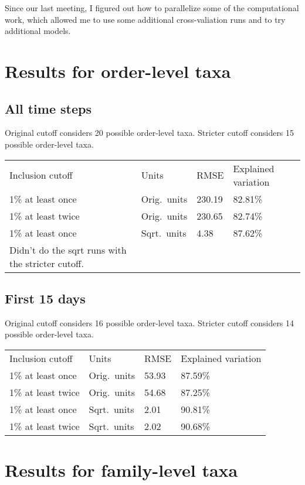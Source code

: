 \documentclass{article}
\begin{document}
Since our last meeting, I figured out how to parallelize some of the
computational work, which allowed me to use some additional
cross-valiation runs and to try additional models.


\section{Results for order-level taxa}

\subsection{All time steps}

Original cutoff considers 20 possible order-level taxa.
Stricter cutoff considers 15 possible order-level taxa.

\begin{tabular}{llll}
Inclusion cutoff & Units  & RMSE & Explained variation\\
1\% at least once  & Orig.~units & 230.19 & 82.81\%\\
1\% at least twice & Orig.~units & 230.65 & 82.74\%\\
1\% at least once  & Sqrt.~units &   4.38 & 87.62\%\\
Didn't do the sqrt runs with the stricter cutoff.
\end{tabular}




\subsection{First 15 days}

Original cutoff considers 16 possible order-level taxa.
Stricter cutoff considers 14 possible order-level taxa.

\begin{tabular}{llll}
Inclusion cutoff & Units  & RMSE & Explained variation\\
1\% at least once  & Orig.~units & 53.93 & 87.59\%\\
1\% at least twice & Orig.~units & 54.68 & 87.25\%\\
1\% at least once  & Sqrt.~units & 2.01 & 90.81\%\\
1\% at least twice & Sqrt.~units & 2.02 & 90.68\%
\end{tabular}



\section{Results for family-level taxa}
\end{document}
